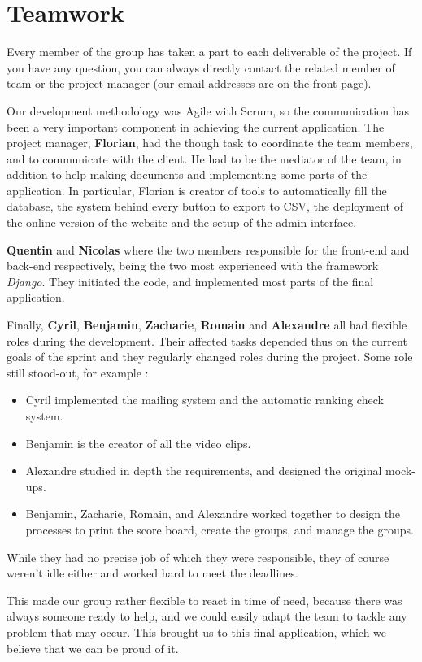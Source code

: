 \section{Teamwork}
\label{sec:Teamwork}

Every member of the group has taken a part to each deliverable of the project.
If you have any question, you can always directly contact the related member of
team or the project manager (our email addresses are on the front page). \newline

Our development methodology was Agile with Scrum, so the communication has
been a very important component in achieving the current application.
The project manager, \textbf{Florian}, had the though task to coordinate the
team members, and to communicate with the client. He had to be the mediator of
the team, in addition to help making documents and implementing some parts of
the application. In particular, Florian is creator of tools to automatically
fill the database, the system behind every button to export to CSV, the
deployment of the online version of the website and the setup of the admin
interface.\newline

\textbf{Quentin} and \textbf{Nicolas} where the two members responsible for
the front-end and back-end respectively, being the two most experienced with
the framework \textit{Django}. They initiated the code, and implemented most
parts of the final application.\newline

Finally, \textbf{Cyril}, \textbf{Benjamin}, \textbf{Zacharie}, \textbf{Romain}
and \textbf{Alexandre} all had flexible roles during the development.
Their affected tasks depended thus on the current goals of the sprint and they
regularly changed roles during the project. Some role still stood-out, for example :

\begin{itemize}
\item Cyril implemented the mailing system  and the automatic ranking check system.
\item Benjamin is the creator of all the video clips.
\item Alexandre studied in depth the requirements, and designed the original mock-ups.
\item Benjamin, Zacharie, Romain, and Alexandre worked together to design the
processes to print the score board, create the groups, and manage the groups.
\end{itemize}
\bigskip

While they had no precise job of which they were responsible, they of course
weren't idle either and worked hard to meet the deadlines.\newline

This made our group rather flexible to react in time of need, because there was
always someone ready to help, and we could easily adapt the team to tackle any
problem that may occur. This brought us to this final application, which we
believe that we can be proud of it. \newline
